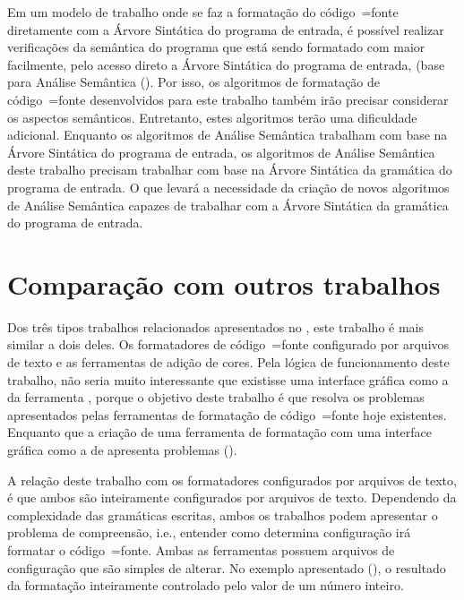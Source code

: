 Em um modelo de trabalho onde se faz a formatação do código~=fonte diretamente com a Árvore Sintática do programa de entrada,
é possível realizar verificações da semântica do programa que está sendo formatado com maior facilmente,
pelo acesso direto a Árvore Sintática do programa de entrada,
(base para Análise Semântica ().
Por isso,
os algoritmos de formatação de código~=fonte desenvolvidos para este trabalho também irão precisar considerar os aspectos semânticos.
Entretanto,
estes algoritmos terão uma dificuldade adicional.
Enquanto os algoritmos de Análise Semântica trabalham com base na Árvore Sintática do programa de entrada,
os algoritmos de Análise Semântica deste trabalho precisam trabalhar com base na Árvore Sintática da gramática do programa de entrada.
O que levará a necessidade da criação de novos algoritmos de Análise Semântica capazes de trabalhar com a Árvore Sintática da gramática do programa de entrada.


\section{Comparação com outros trabalhos}

Dos três tipos trabalhos relacionados apresentados no ,
este trabalho é mais similar a dois deles.
Os formatadores de código~=fonte configurado por arquivos de texto e
as ferramentas de adição de cores.
Pela lógica de funcionamento deste trabalho,
não seria muito interessante que existisse uma interface gráfica como a da ferramenta \cite{universalIndentGUI},
porque o objetivo deste trabalho é que resolva os problemas apresentados pelas ferramentas de formatação de código~=fonte hoje existentes.
Enquanto que a criação de uma ferramenta de formatação com uma interface gráfica como a de \cite{universalIndentGUI} apresenta problemas ().

A relação deste trabalho com os formatadores configurados por arquivos de texto,
é que ambos são inteiramente configurados por arquivos de texto.
Dependendo da complexidade das gramáticas escritas,
ambos os trabalhos podem apresentar o problema de compreensão,
i.e.,
entender como determina configuração irá formatar o código~=fonte.
Ambas as ferramentas possuem arquivos de configuração que são simples de alterar.
No exemplo apresentado (),
o resultado da formatação inteiramente controlado pelo valor de um número inteiro.

